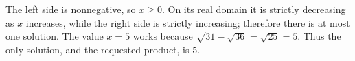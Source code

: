 The left side is nonnegative, so $x\ge0$. On its real domain it is strictly decreasing as $x$ increases, while the right side is strictly increasing; therefore there is at most one solution. The value $x=5$ works because $\sqrt{31-\sqrt{36}}=\sqrt{25}=5$. Thus the only solution, and the requested product, is $\boxed5$.
